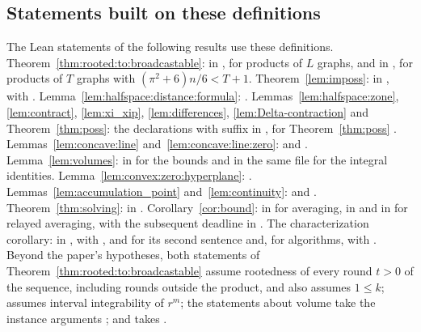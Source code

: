 \subsection{Statements built on these definitions}\label{app:lean-statements}

The Lean statements of the following results use these definitions. Theorem~\ref{thm:rooted:to:broadcastable}:  in , for products of $L$ graphs, and  in , for products of $T$ graphs with $(\pi^2+6)n/6<T+1$. Theorem~\ref{lem:imposs}:  in , with . Lemma~\ref{lem:halfspace:distance:formula}: . Lemmas~\ref{lem:halfspace:zone}, \ref{lem:contract}, \ref{lem:xi_xip}, \ref{lem:differences}, \ref{lem:Delta-contraction} and Theorem~\ref{thm:poss}: the declarations with suffix  in , for Theorem~\ref{thm:poss} . Lemmas~\ref{lem:concave:line} and~\ref{lem:concave:line:zero}:  and . Lemma~\ref{lem:volumes}:  in  for the bounds and  in the same file for the integral identities. Lemma~\ref{lem:convex:zero:hyperplane}: . Lemmas~\ref{lem:accumulation_point} and~\ref{lem:continuity}:  and . Theorem~\ref{thm:solving}:  in . Corollary~\ref{cor:bound}:  in  for averaging,  in  and  in  for relayed averaging, with the subsequent deadline in . The characterization corollary:  in , with , and for its second sentence  and, for algorithms,  with . Beyond the paper's hypotheses, both statements of Theorem~\ref{thm:rooted:to:broadcastable} assume rootedness of every round $t>0$ of the sequence, including rounds outside the product, and  also assumes $1\leq k$;  assumes interval integrability of $r^m$; the statements about volume take the instance arguments \lean{[MeasurableSpace V] [BorelSpace V]}; and  takes \lean{[DecidableEq V]}.

\endgroup

